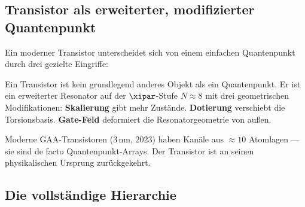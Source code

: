 \subsection{Transistor als erweiterter, modifizierter Quantenpunkt}

Ein moderner Transistor unterscheidet sich von einem einfachen
Quantenpunkt durch drei gezielte Eingriffe:

\begin{center}
\end{center}

\begin{keyresult}
Ein Transistor ist kein grundlegend anderes Objekt als ein Quantenpunkt.
Er ist ein erweiterter Resonator auf der $\xipar$-Stufe $N \approx 8$
mit drei geometrischen Modifikationen:
\textbf{Skalierung} gibt mehr Zustände.
\textbf{Dotierung} verschiebt die Torsionsbasis.
\textbf{Gate-Feld} deformiert die Resonatorgeometrie von außen.

Moderne GAA-Transistoren (3\,nm, 2023) haben Kanäle aus
$\approx 10$ Atomlagen --- sie sind de facto Quantenpunkt-Arrays.
Der Transistor ist an seinen physikalischen Ursprung zurückgekehrt.
\end{keyresult}

\subsection{Die vollständige Hierarchie}

